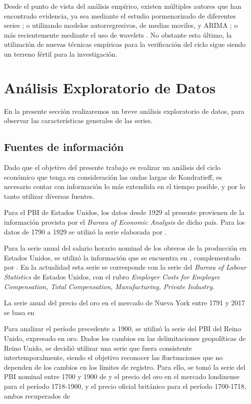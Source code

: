 \documentclass[a4paper]{article}
\begin{document}
Desde el punto de vista del análisis empírico, existen múltiples autores que han encontrado evidencia, ya sea mediante el estudio pormenorizado de diferentes series  \citep{kuznets1930secular,kondratieff1979long,schumpeter1939business}; o utilizando  modelos autorregresivos, de medias moviles, y ARIMA \citep{hamilton1989new,kaiser2012measuring}; o más recientemente mediante el uso de wavelets \citep{yogo2008measuring,soares2011business}. No obstante esto último, la utilización de nuevas técnicas empíricas para la verificación del ciclo sigue siendo un terreno fértil para la investigación.

\section{Análisis Exploratorio de Datos}
En la presente sección realizaremos un breve análisis exploratorio de datos, para observar las características generales de las series.

\subsection{Fuentes de información}

Dado que el objetivo del presente trabajo es realizar un análisis del ciclo económico que tenga en consideración las ondas largas de Kondratieff, es necesario contar con información lo más extendida en el tiempo posible, y por lo tanto utilizar diversas fuentes. 

Para el PBI de Estados Unidos, los datos desde 1929 al presente provienen de la información provista por el \textit{Bureau of Economic Analysis} de dicho país. Para los datos de 1790 a 1929 se utilizó la serie elaborada por \cite{johnston2018us}.

Para la serie anual del salario horario nominal de los obreros de la producción en Estados Unidos, se utilizó la información que se encuentra en \cite{officer2009two}, complementado por \cite{Roesch2018}. En la actualidad esta serie se corresponde con la serie del \textit{Bureau of Labour Statistics} de Estados Unidos, con el rubro \textit{Employer Costs for Employee Compensation, Total Compensation, Manufacturing, Private Industry}.

La serie anual del precio del oro en el mercado de Nueva York entre 1791 y 2017 se basa en \cite{officer2018gold}

Para analizar el período precedente a 1900, se utilizó la serie del PBI del Reino Unido, expresado en oro. Dados los cambios en las delimitaciones geopolíticas de Reino Unido, se decidió utilizar una serie que fuera consistente intertemporalmente, siendo el objetivo reconocer las fluctuaciones que no dependen de los cambios en los límites de registro. Para ello, se tomó la serie del PBI nominal entre 1700 y 1900 de \cite{Williamson2018uk} y el precio del oro en el mercado londinense para el período 1718-1900, y el precio oficial británico para el período 1700-1718, ambos recuperados de \cite{officer2018gold} 
\end{document}
